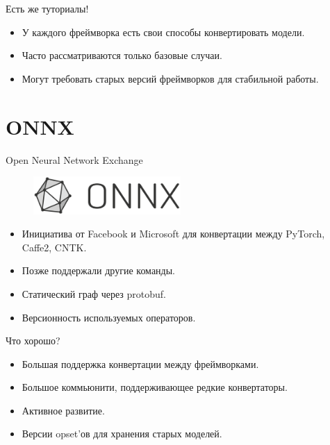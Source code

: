 \documentclass[mathserif,serif,unicode]{beamer}
\begin{document}
\begin{frame}{Есть же туториалы!}
    \begin{itemize}
        \item У каждого фреймворка есть свои способы конвертировать модели.
        \item Часто рассматриваются только базовые случаи.
        \item Могут требовать старых версий фреймворков для стабильной работы.
    \end{itemize}

\end{frame}

\section{ONNX}

\begin{frame}{Open Neural Network Exchange}
    
    \begin{figure}
        \includegraphics[width=0.5\textwidth]{images/ONNX_logo_main.png}
    \end{figure}

    \begin{itemize}
        \item Инициатива от Facebook и Microsoft для конвертации между PyTorch, Caffe2, CNTK.
        \item Позже поддержали другие команды.
        \vspace{5mm}
        \item Статический граф через protobuf.
        \item Версионность используемых операторов.
    \end{itemize}
\end{frame}

\begin{frame}{Что хорошо?}
    \begin{itemize}
        \item Большая поддержка конвертации между фреймворками.
        \item Большое коммьюнити, поддерживающее редкие конвертаторы.
        \item Активное развитие.
        \item Версии opset'ов для хранения старых моделей.
    \end{itemize}
\end{frame}
\end{document}
